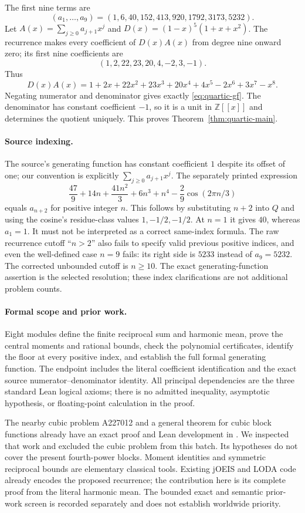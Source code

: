 The first nine terms are
\[
 (a_1,\ldots,a_9)=(1,6,40,152,413,920,1792,3173,5232).
\]
Let $A(x)=\sum_{j\ge0}a_{j+1}x^j$ and
$D(x)=(1-x)^5(1+x+x^2)$.
The recurrence makes every coefficient of $D(x)A(x)$ from degree nine
onward zero; its first nine coefficients are
\[
 (1,2,22,23,20,4,-2,3,-1).
\]
Thus
\[
 D(x)A(x)=1+2x+22x^2+23x^3+20x^4+4x^5-2x^6+3x^7-x^8.
\]
Negating numerator and denominator gives exactly
\eqref{eq:quartic-gf}. The denominator has constant coefficient $-1$,
so it is a unit in $\mathbb Z[[x]]$ and determines the quotient uniquely.
This proves Theorem~\ref{thm:quartic-main}.

\paragraph{Source indexing.}
The source's generating function has constant coefficient $1$ despite
its offset of one; our convention is explicitly $\sum_{j\ge0}a_{j+1}x^j$.
The separately printed expression
\[
 \frac{47}{9}+14n+\frac{41n^2}{3}+6n^3+n^4
       -\frac29\cos(2\pi n/3)
\]
equals $a_{n+2}$ for positive integer $n$. This follows by substituting
$n+2$ into $Q$ and using the cosine's residue-class values $1,-1/2,-1/2$.
At $n=1$ it gives $40$, whereas $a_1=1$. It must not be interpreted
as a correct same-index formula. The raw recurrence cutoff ``$n>2$''
also fails to specify valid previous positive indices, and even the
well-defined case $n=9$ fails: its right side is $5233$ instead of
$a_9=5232$. The corrected unbounded cutoff is $n\ge10$.
The exact generating-function assertion is the selected resolution;
these index clarifications are not additional problem counts.

\paragraph{Formal scope and prior work.}
Eight modules define the finite reciprocal sum and harmonic mean,
prove the central moments and rational bounds, check the polynomial
certificates, identify the floor at every positive index, and establish
the full formal generating function. The endpoint
 includes the literal coefficient
identification and the exact source numerator--denominator identity.
All principal dependencies are the three standard Lean logical axioms;
there is no admitted inequality, asymptotic hypothesis, or floating-point
calculation in the proof.

The nearby cubic problem A227012 and a general theorem for cubic block
functions already have an exact proof and Lean development in
 \cite{prior-cubic-harmonic}.
We inspected that work and excluded the cubic problem from this batch.
Its hypotheses do not cover the present fourth-power blocks.
Moment identities and symmetric reciprocal bounds are elementary
classical tools. Existing jOEIS and LODA code already encodes the proposed
recurrence; the contribution here is its complete proof from the literal
harmonic mean. The bounded exact and semantic prior-work screen is
recorded separately and does not establish worldwide priority.
